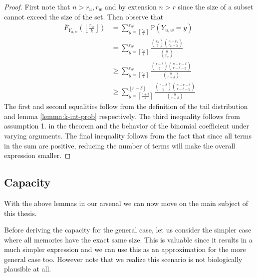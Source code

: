     \begin{proof}  
        First note that $n > r_u, r_w$ and by extension $n > r$ since the size of a subset cannot exceed the size of the set.  
        Then observe that 
        \begin{equation}
            \begin{split}
                \bar{F}_{Y_{u,w}}\left(\left\lfloor \frac{r_w}{k} \right\rfloor\right)  
                &=
                 \sum_{y = \left\lceil \frac{r_w}{k} \right\rceil}^{r_w} \mathbb{P}(Y_{u,w}=y)  
                \\[2em] &=    \sum_{y = \left\lceil \frac{r_w}{k} \right\rceil}^{r_w} \frac{\binom{r_u}{y} \binom{n-r_u}{r_w-y}}{\binom{n}{r_w}} 
                \\[2em] &\ge  \sum_{y = \left\lceil \frac{r_w}{k} \right\rceil}^{r_w} \frac{\binom{r-\delta}{y} \binom{n-r-\delta}{r-\delta-y}}{\binom{n}{r+\delta}}  
                \\[2em] &\ge  \sum_{y = \left\lceil \frac{r+\delta}{k} \right\rceil}^{\left\lfloor r - \delta \right\rfloor} \frac{\binom{r-\delta}{y} \binom{n-r-\delta}{r-\delta-y}}{\binom{n}{r+\delta}}  
            \end{split}
        \end{equation}
        The first and second equalities follow from the definition of the tail distribution and lemma \ref{lemma:k-int-prob} respectively. The third inequality follows from assumption 1. in the theorem and the behavior of the binomial coefficient under varying arguments. The final inequality follows from the fact that since all terms in the sum are positive, reducing the number of terms will make the overall expression smaller.
        
    \end{proof}

    \subsection{Capacity}
    With the above lemmas in our arsenal we can now move on  the main subject of this thesis. 
    
    Before deriving the capacity for the general case, let us consider the simpler case where all memories have the exact same size. This is valuable since it results in a much simpler expression and we can use this as an approximation for the more general case too. However note that we realize this scenario is not biologically plausible at all. 

